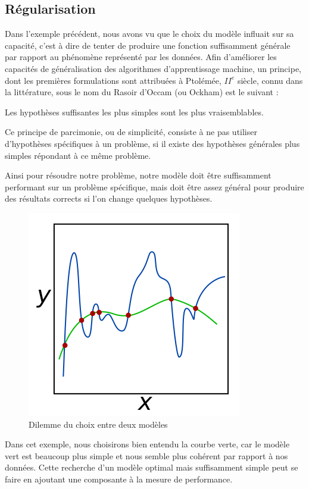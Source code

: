 \documentclass[a4paper, 11pt]{report}
\begin{document}
\subsection{Régularisation}
Dans l'exemple précédent, nous avons vu que le choix du modèle influait sur sa capacité, c'est à dire de tenter de produire une fonction suffisamment générale par rapport au phénomène représenté par les données.
Afin d'améliorer les capacités de généralisation des algorithmes d'apprentissage machine, un principe, dont les premières formulations sont attribuées à Ptolémée, $II^e$ siècle, connu dans la littérature, sous le nom du Rasoir d'Occam (ou Ockham) est le suivant : 
\begin{displayquote}
	Les hypothèses suffisantes les plus simples sont les plus vraisemblables.
\end{displayquote}
Ce principe de parcimonie, ou de simplicité, consiste à ne pas utiliser d'hypothèses spécifiques à un problème, si il existe des hypothèses générales plus simples répondant à ce même problème.

Ainsi pour résoudre notre problème, notre modèle doit être suffisamment performant sur un problème spécifique, mais doit être assez général pour produire des résultats corrects si l'on change quelques hypothèses.
\begin{figure}[H]
	\centering
	\includegraphics[scale=0.375]{Images/Regularization.png}
	\caption{Dilemme du choix entre deux modèles \citep{Wikipedia2017c}}
\end{figure}
Dans cet exemple, nous choisirons bien entendu la courbe verte, car le modèle vert est beaucoup plus simple et nous semble plus cohérent par rapport à nos données.
Cette recherche d'un modèle optimal mais suffisamment simple peut se faire en ajoutant une composante à la mesure de performance.
\end{document}
